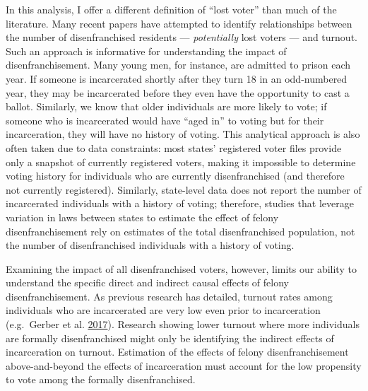 \documentclass[
  12pt,
]{article}
\begin{document}
In this analysis, I offer a different definition of ``lost voter'' than much of the literature. Many recent papers have attempted to identify relationships between the number of disenfranchised residents --- \emph{potentially} lost voters --- and turnout. Such an approach is informative for understanding the impact of disenfranchisement. Many young men, for instance, are admitted to prison each year. If someone is incarcerated shortly after they turn 18 in an odd-numbered year, they may be incarcerated before they even have the opportunity to cast a ballot. Similarly, we know that older individuals are more likely to vote; if someone who is incarcerated would have ``aged in'' to voting but for their incarceration, they will have no history of voting. This analytical approach is also often taken due to data constraints: most states' registered voter files provide only a snapshot of currently registered voters, making it impossible to determine voting history for individuals who are currently disenfranchised (and therefore not currently registered). Similarly, state-level data does not report the number of incarcerated individuals with a history of voting; therefore, studies that leverage variation in laws between states to estimate the effect of felony disenfranchisement rely on estimates of the total disenfranchised population, not the number of disenfranchised individuals with a history of voting.

Examining the impact of all disenfranchised voters, however, limits our ability to understand the specific direct and indirect causal effects of felony disenfranchisement. As previous research has detailed, turnout rates among individuals who are incarcerated are very low even prior to incarceration (e.g.~Gerber et al. \protect\hyperlink{ref-Gerber2017}{2017}). Research showing lower turnout where more individuals are formally disenfranchised might only be identifying the indirect effects of incarceration on turnout. Estimation of the effects of felony disenfranchisement above-and-beyond the effects of incarceration must account for the low propensity to vote among the formally disenfranchised.
\end{document}
